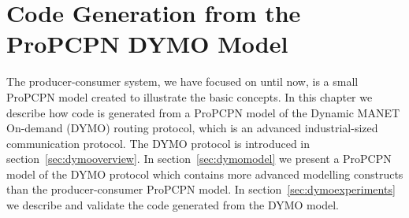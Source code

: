 \chapter{Code Generation from the ProPCPN DYMO Model}
\label{chap:dymo}
The producer-consumer system, we have focused on until now, is a small ProPCPN model created to illustrate the basic concepts. In this chapter we describe how code is generated from a ProPCPN model of the Dynamic MANET On-demand (DYMO) routing protocol, which is an advanced industrial-sized communication protocol. The DYMO protocol is introduced in section~\ref{sec:dymooverview}. In section~\ref{sec:dymomodel} we present a ProPCPN model of the DYMO protocol which contains more advanced modelling constructs than the producer-consumer ProPCPN model. In section~\ref{sec:dymoexperiments} we describe and validate the code generated from the DYMO model. 






